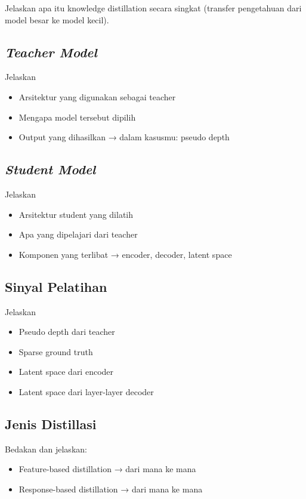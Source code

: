 Jelaskan apa itu knowledge distillation secara singkat (transfer pengetahuan dari model besar ke model kecil).

\subsection{\textit{Teacher Model}}
Jelaskan
\begin{itemize}
	\item{Arsitektur yang digunakan sebagai teacher}
	\item{Mengapa model tersebut dipilih}
	\item{Output yang dihasilkan → dalam kasusmu: pseudo depth}
\end{itemize}

\subsection{\textit{Student Model}}
Jelaskan
\begin{itemize}
	\item{Arsitektur student yang dilatih}
	\item{Apa yang dipelajari dari teacher}
	\item{Komponen yang terlibat → encoder, decoder, latent space}
\end{itemize}

\subsection{Sinyal Pelatihan}
Jelaskan
\begin{itemize}
	\item{Pseudo depth dari teacher}
	\item{Sparse ground truth}
	\item{Latent space dari encoder}
	\item{Latent space dari layer-layer decoder}
\end{itemize}

\subsection{Jenis Distillasi}
Bedakan dan jelaskan:
\begin{itemize}
	\item{Feature-based distillation → dari mana ke mana}
	\item{Response-based distillation → dari mana ke mana}
\end{itemize}

